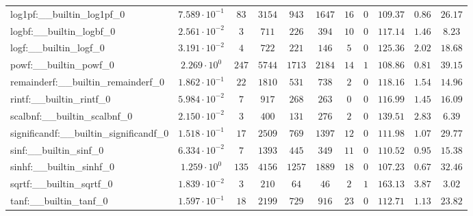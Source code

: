 \begin{tabular}{|l|c|c|c|c|c|c|c|c|c|c|}
log1pf:\_\_builtin\_log1pf\_0             & $ 7.589 \cdot 10^{-1} $ & $ 83     $ & $ 3154  $ & $ 943   $ & $ 1647  $ & $ 16  $ & $ 0 $ & $ 109.37      $ & $ 0.86    $ & $ 26.17   $ \\
logbf:\_\_builtin\_logbf\_0               & $ 2.561 \cdot 10^{-2} $ & $ 3      $ & $ 711   $ & $ 226   $ & $ 394   $ & $ 10  $ & $ 0 $ & $ 117.14      $ & $ 1.46    $ & $ 8.23    $ \\
logf:\_\_builtin\_logf\_0                 & $ 3.191 \cdot 10^{-2} $ & $ 4      $ & $ 722   $ & $ 221   $ & $ 146   $ & $ 5   $ & $ 0 $ & $ 125.36      $ & $ 2.02    $ & $ 18.68   $ \\
powf:\_\_builtin\_powf\_0                 & $ 2.269 \cdot 10^{0}  $ & $ 247    $ & $ 5744  $ & $ 1713  $ & $ 2184  $ & $ 14  $ & $ 1 $ & $ 108.86      $ & $ 0.81    $ & $ 39.15   $ \\
remainderf:\_\_builtin\_remainderf\_0     & $ 1.862 \cdot 10^{-1} $ & $ 22     $ & $ 1810  $ & $ 531   $ & $ 738   $ & $ 2   $ & $ 0 $ & $ 118.16      $ & $ 1.54    $ & $ 14.96   $ \\
rintf:\_\_builtin\_rintf\_0               & $ 5.984 \cdot 10^{-2} $ & $ 7      $ & $ 917   $ & $ 268   $ & $ 263   $ & $ 0   $ & $ 0 $ & $ 116.99      $ & $ 1.45    $ & $ 16.09   $ \\
scalbnf:\_\_builtin\_scalbnf\_0           & $ 2.150 \cdot 10^{-2} $ & $ 3      $ & $ 400   $ & $ 131   $ & $ 276   $ & $ 2   $ & $ 0 $ & $ 139.51      $ & $ 2.83    $ & $ 6.39    $ \\
significandf:\_\_builtin\_significandf\_0 & $ 1.518 \cdot 10^{-1} $ & $ 17     $ & $ 2509  $ & $ 769   $ & $ 1397  $ & $ 12  $ & $ 0 $ & $ 111.98      $ & $ 1.07    $ & $ 29.77   $ \\
sinf:\_\_builtin\_sinf\_0                 & $ 6.334 \cdot 10^{-2} $ & $ 7      $ & $ 1393  $ & $ 445   $ & $ 349   $ & $ 11  $ & $ 0 $ & $ 110.52      $ & $ 0.95    $ & $ 15.38   $ \\
sinhf:\_\_builtin\_sinhf\_0               & $ 1.259 \cdot 10^{0}  $ & $ 135    $ & $ 4156  $ & $ 1257  $ & $ 1889  $ & $ 18  $ & $ 0 $ & $ 107.23      $ & $ 0.67    $ & $ 32.46   $ \\
sqrtf:\_\_builtin\_sqrtf\_0               & $ 1.839 \cdot 10^{-2} $ & $ 3      $ & $ 210   $ & $ 64    $ & $ 46    $ & $ 2   $ & $ 1 $ & $ 163.13      $ & $ 3.87    $ & $ 3.02    $ \\
tanf:\_\_builtin\_tanf\_0                 & $ 1.597 \cdot 10^{-1} $ & $ 18     $ & $ 2199  $ & $ 729   $ & $ 916   $ & $ 23  $ & $ 0 $ & $ 112.71      $ & $ 1.13    $ & $ 23.82   $ \\

\end{tabular}
